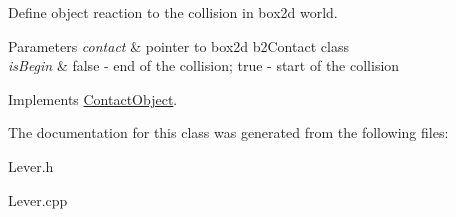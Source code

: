 Define object reaction to the collision in box2d world. 


\begin{DoxyParams}{Parameters}
{\em contact} & pointer to box2d b2\+Contact class \\
\hline
{\em is\+Begin} & \textquotesingle{}false\textquotesingle{} -\/ end of the collision; \textquotesingle{}true\textquotesingle{} -\/ start of the collision \\
\hline
\end{DoxyParams}


Implements \hyperlink{class_contact_object_a53d2dfc1d9c2821e9c62e80ce62a6435}{Contact\+Object}.



The documentation for this class was generated from the following files\+:\begin{DoxyCompactItemize}
\item 
Lever.\+h\item 
Lever.\+cpp\end{DoxyCompactItemize}
